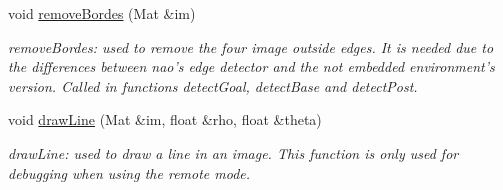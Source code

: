 \begin{DoxyCompactItemize}
void \hyperlink{classVS_a99f6a56775cd4126079b56ad91822d08}{remove\-Bordes} (Mat \&im)
\begin{DoxyCompactList}\small\item\em remove\-Bordes\-: used to remove the four image outside edges. It is needed due to the differences between nao's edge detector and the not embedded environment's version. Called in functions detect\-Goal, detect\-Base and detect\-Post. \end{DoxyCompactList}\item 
void \hyperlink{classVS_a7c34a0e02cb351b9f23ac52ce6113fa3}{draw\-Line} (Mat \&im, float \&rho, float \&theta)
\begin{DoxyCompactList}\small\item\em draw\-Line\-: used to draw a line in an image. This function is only used for debugging when using the remote mode. \end{DoxyCompactList}\end{DoxyCompactItemize}
